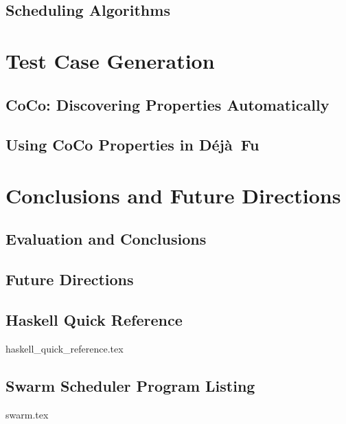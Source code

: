 \documentclass[openright,imperial,11pt]{octavo}
\newcommand{\dejafu}{D\'{e}j\`{a}~Fu}
\begin{document}
\chapter{Scheduling Algorithms}
\label{chp:algorithms}


\part{Test Case Generation}
\label{part:properties}

\chapter{CoCo: Discovering Properties Automatically}
\label{chp:coco}


\chapter{Using CoCo Properties in \dejafu{}}
\label{chp:coco_and_dejafu}


\part{Conclusions and Future Directions}
\label{part:end}

\chapter{Evaluation and Conclusions}
\label{chp:conclusions}


\chapter{Future Directions}
\label{chp:future_work}


\begin{appendices}
\chapter{Haskell Quick Reference}
\label{app:haskell}
{haskell_quick_reference.tex}

\chapter{Swarm Scheduler Program Listing}
\label{app:swarm}
{swarm.tex}
\end{appendices}

\printbibliography[heading=bibintoc]
\end{document}
